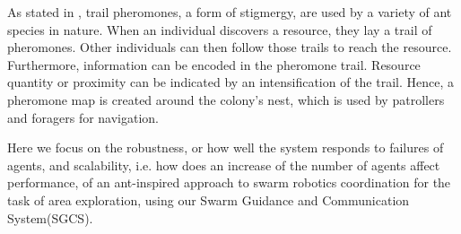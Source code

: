 \par As stated in \parencite{robinson_decay_2008}, trail pheromones, a form of stigmergy, are used by a variety of ant species in nature. When an individual discovers a resource, they lay a trail of pheromones. Other individuals can then follow those trails to reach the resource. Furthermore, information can be encoded in the pheromone trail. Resource quantity or proximity can be indicated by an intensification of the trail. Hence, a pheromone map is created around the colony's nest, which is used by patrollers and foragers for navigation. 
\par Here we focus on the robustness, or how well the system responds to failures of agents, and scalability, i.e. how does an increase of the number of agents affect performance, of an ant-inspired approach to swarm robotics coordination for the task of area exploration, using our Swarm Guidance and Communication System(SGCS). 

